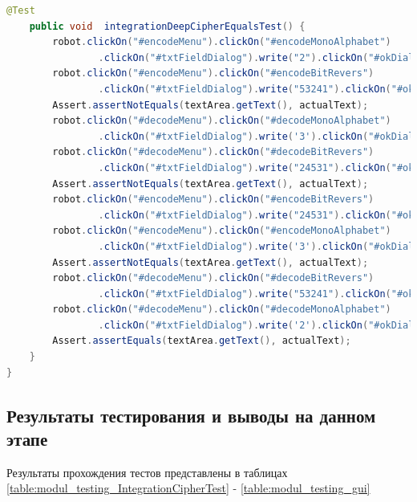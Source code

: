 \documentclass[a4paper,12pt]{article}
\begin{document}
\begin{lstlisting}[language=java, caption=класс MainWindowUiIntegrationTest, label=listing_mainWindow:MainWindowUiIntegrationTestn]
    @Test
    public void  integrationDeepCipherEqualsTest() {
        robot.clickOn("#encodeMenu").clickOn("#encodeMonoAlphabet")
                .clickOn("#txtFieldDialog").write("2").clickOn("#okDialog");
        robot.clickOn("#encodeMenu").clickOn("#encodeBitRevers")
                .clickOn("#txtFieldDialog").write("53241").clickOn("#okDialog");
        Assert.assertNotEquals(textArea.getText(), actualText);
        robot.clickOn("#decodeMenu").clickOn("#decodeMonoAlphabet")
                .clickOn("#txtFieldDialog").write('3').clickOn("#okDialog");
        robot.clickOn("#decodeMenu").clickOn("#decodeBitRevers")
                .clickOn("#txtFieldDialog").write("24531").clickOn("#okDialog");
        Assert.assertNotEquals(textArea.getText(), actualText);
        robot.clickOn("#encodeMenu").clickOn("#encodeBitRevers")
                .clickOn("#txtFieldDialog").write("24531").clickOn("#okDialog");
        robot.clickOn("#encodeMenu").clickOn("#encodeMonoAlphabet")
                .clickOn("#txtFieldDialog").write('3').clickOn("#okDialog");
        Assert.assertNotEquals(textArea.getText(), actualText);
        robot.clickOn("#decodeMenu").clickOn("#decodeBitRevers")
                .clickOn("#txtFieldDialog").write("53241").clickOn("#okDialog");
        robot.clickOn("#decodeMenu").clickOn("#decodeMonoAlphabet")
                .clickOn("#txtFieldDialog").write('2').clickOn("#okDialog");
        Assert.assertEquals(textArea.getText(), actualText);
    }
}
\end{lstlisting}

\subsection{Результаты тестирования и выводы на данном этапе}

Результаты прохождения тестов представлены в таблицах \ref{table:modul_testing_IntegrationCipherTest} - \ref{table:modul_testing_gui}
\end{document}
